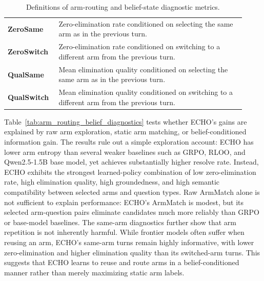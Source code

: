 \documentclass[11pt]{article}
\theoremstyle{plain}
\theoremstyle{definition}
\theoremstyle{remark}
\begin{document}
\begin{table}[t]
\begin{tabular}{p{0.18\linewidth}p{0.74\linewidth}}
\textbf{ZeroSame} & Zero-elimination rate conditioned on selecting the same arm as in the previous turn. \\

\textbf{ZeroSwitch} & Zero-elimination rate conditioned on switching to a different arm from the previous turn. \\

\textbf{QualSame} & Mean elimination quality conditioned on selecting the same arm as in the previous turn. \\

\textbf{QualSwitch} & Mean elimination quality conditioned on switching to a different arm from the previous turn. \\
\bottomrule
\end{tabular}
\caption{Definitions of arm-routing and belief-state diagnostic metrics.}
\label{tab:arm_metric_definitions}
\end{table}
Table~\ref{tab:arm_routing_belief_diagnostics} tests whether \textsc{ECHO}'s gains are explained by raw arm exploration, static arm matching, or belief-conditioned information gain. The results rule out a simple exploration account: \textsc{ECHO} has lower arm entropy than several weaker baselines such as GRPO, RLOO, and Qwen2.5-1.5B base model, yet achieves substantially higher resolve rate. Instead, \textsc{ECHO} exhibits the strongest learned-policy combination of low zero-elimination rate, high elimination quality, high groundedness, and high semantic compatibility between selected arms and question types. Raw ArmMatch alone is not sufficient to explain performance: \textsc{ECHO}'s ArmMatch is modest, but its selected arm-question pairs eliminate candidates much more reliably than GRPO or base-model baselines. The same-arm diagnostics further show that arm repetition is not inherently harmful. While frontier models often suffer when reusing an arm, \textsc{ECHO}'s same-arm turns remain highly informative, with lower zero-elimination and higher elimination quality than its switched-arm turns. This suggests that \textsc{ECHO} learns to reuse and route arms in a belief-conditioned manner rather than merely maximizing static arm labels.
\end{document}
